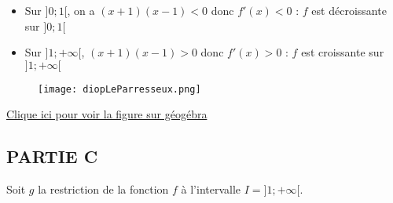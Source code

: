 \documentclass[12pt,a4paper]{article}
\begin{document}
\begin{enumerate}
\begin{itemize}
    \item Sur \( ]0 ; 1[ \), on a \( (x + 1)(x - 1) < 0 \)  
          donc \( f'(x) < 0 \) : \( f \) est décroissante sur \( ]0 ; 1[ \)

    \item Sur \( ]1 ; +\infty[ \), \( (x + 1)(x - 1) > 0 \)  
          donc \( f'(x) > 0 \) : \( f \) est croissante sur \( ]1 ; +\infty[ \)
\end{itemize}

\vspace{1em}


\begin{center}
        \begin{figure}[H]%
         \centering
         \texttt{[image: diopLeParresseux.png]}
        \end{figure}
    \end{center}
        \href{https://www.geogebra.org/classic/efgm6ucx}{Clique ici pour voir la figure sur géogébra}

\end{enumerate}

\subsection*{PARTIE C}

Soit \( g \) la restriction de la fonction \( f \) à l’intervalle \( I = ]1 ; +\infty[ \).
\end{document}
